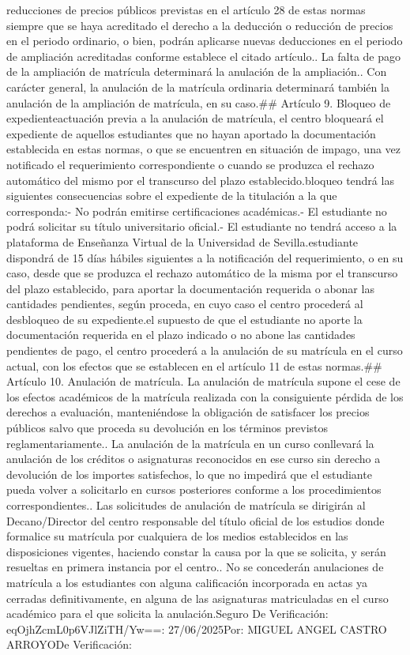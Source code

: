 \documentclass{article}
\begin{document}
\begin{itemize}
reducciones de precios públicos previstas en el artículo 28 de estas normas siempre que se haya acreditado el derecho a la deducción o reducción de precios en el periodo ordinario, o bien, podrán aplicarse nuevas deducciones en el periodo de ampliación acreditadas conforme establece el citado artículo.\n{}. La falta de pago de la ampliación de matrícula determinará la anulación de la ampliación.\n{}. Con carácter general, la anulación de la matrícula ordinaria determinará también la anulación de la ampliación de matrícula, en su caso.\n\n## Artículo 9. Bloqueo de expediente\n\nComo actuación previa a la anulación de matrícula, el centro bloqueará el expediente de aquellos estudiantes que no hayan aportado la documentación establecida en estas normas, o que se encuentren en situación de impago, una vez notificado el requerimiento correspondiente o cuando se produzca el rechazo automático del mismo por el transcurso del plazo establecido.\n\nEste bloqueo tendrá las siguientes consecuencias sobre el expediente de la titulación a la que corresponda:\n\n- No podrán emitirse certificaciones académicas.\n- El estudiante no podrá solicitar su título universitario oficial.\n- El estudiante no tendrá acceso a la plataforma de Enseñanza Virtual de la Universidad de Sevilla.\n\nEl estudiante dispondrá de 15 días hábiles siguientes a la notificación del requerimiento, o en su caso, desde que se produzca el rechazo automático de la misma por el transcurso del plazo establecido, para aportar la documentación requerida o abonar las cantidades pendientes, según proceda, en cuyo caso el centro procederá al desbloqueo de su expediente.\n\nEn el supuesto de que el estudiante no aporte la documentación requerida en el plazo indicado o no abone las cantidades pendientes de pago, el centro procederá a la anulación de su matrícula en el curso actual, con los efectos que se establecen en el artículo 11 de estas normas.\n\n## Artículo 10. Anulación de matrícula\n{}. La anulación de matrícula supone el cese de los efectos académicos de la matrícula realizada con la consiguiente pérdida de los derechos a evaluación, manteniéndose la obligación de satisfacer los precios públicos salvo que proceda su devolución en los términos previstos reglamentariamente.\n{}. La anulación de la matrícula en un curso conllevará la anulación de los créditos o asignaturas reconocidos en ese curso sin derecho a devolución de los importes satisfechos, lo que no impedirá que el estudiante pueda volver a solicitarlo en cursos posteriores conforme a los procedimientos correspondientes.\n{}. Las solicitudes de anulación de matrícula se dirigirán al Decano/Director del centro responsable del título oficial de los estudios donde formalice su matrícula por cualquiera de los medios establecidos en las disposiciones vigentes, haciendo constar la causa por la que se solicita, y serán resueltas en primera instancia por el centro.\n{}. No se concederán anulaciones de matrícula a los estudiantes con alguna calificación incorporada en actas ya cerradas definitivamente, en alguna de las asignaturas matriculadas en el curso académico para el que solicita la anulación.\n{} Seguro De Verificación: eqOjhZcmL0p6VJlZiTH/Yw==\nFecha: 27/06/2025\nFirmado Por: MIGUEL ANGEL CASTRO ARROYO\nUrl De Verificación: 
\end{itemize}
\end{document}
